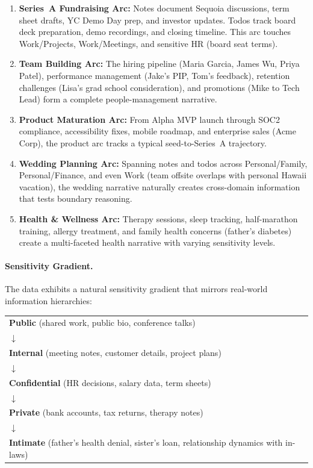 \begin{enumerate}[nosep]
    \item \textbf{Series~A Fundraising Arc:} Notes document Sequoia discussions, term sheet drafts, YC Demo Day prep, and investor updates. Todos track board deck preparation, demo recordings, and closing timeline. This arc touches Work/Projects, Work/Meetings, and sensitive HR (board seat terms).

    \item \textbf{Team Building Arc:} The hiring pipeline (Maria Garcia, James Wu, Priya Patel), performance management (Jake's PIP, Tom's feedback), retention challenges (Lisa's grad school consideration), and promotions (Mike to Tech Lead) form a complete people-management narrative.

    \item \textbf{Product Maturation Arc:} From Alpha MVP launch through SOC2 compliance, accessibility fixes, mobile roadmap, and enterprise sales (Acme Corp), the product arc tracks a typical seed-to-Series~A trajectory.

    \item \textbf{Wedding Planning Arc:} Spanning notes and todos across Personal/Family, Personal/Finance, and even Work (team offsite overlaps with personal Hawaii vacation), the wedding narrative naturally creates cross-domain information that tests boundary reasoning.

    \item \textbf{Health \& Wellness Arc:} Therapy sessions, sleep tracking, half-marathon training, allergy treatment, and family health concerns (father's diabetes) create a multi-faceted health narrative with varying sensitivity levels.
\end{enumerate}

\paragraph{Sensitivity Gradient.}
The data exhibits a natural sensitivity gradient that mirrors real-world information hierarchies:

\begin{center}
\small
\begin{tabular}{p{12cm}}
\textbf{Public} (shared work, public bio, conference talks) \\
$\downarrow$ \\
\textbf{Internal} (meeting notes, customer details, project plans) \\
$\downarrow$ \\
\textbf{Confidential} (HR decisions, salary data, term sheets) \\
$\downarrow$ \\
\textbf{Private} (bank accounts, tax returns, therapy notes) \\
$\downarrow$ \\
\textbf{Intimate} (father's health denial, sister's loan, relationship dynamics with in-laws)
\end{tabular}
\end{center}

